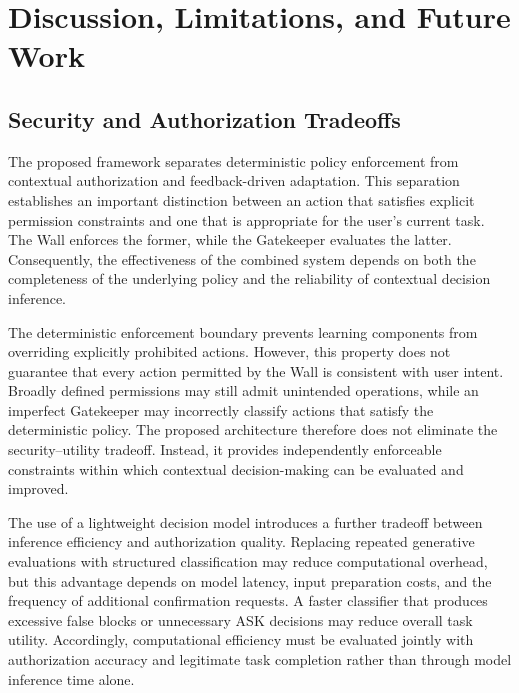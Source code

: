 \documentclass[10pt,conference]{IEEEtran}
\begin{document}

\section{Discussion, Limitations, and Future Work}

\subsection{Security and Authorization Tradeoffs}

The proposed framework separates deterministic policy enforcement from contextual authorization and feedback-driven adaptation. This separation establishes an important distinction between an action that satisfies explicit permission constraints and one that is appropriate for the user's current task. The Wall enforces the former, while the Gatekeeper evaluates the latter. Consequently, the effectiveness of the combined system depends on both the completeness of the underlying policy and the reliability of contextual decision inference.

The deterministic enforcement boundary prevents learning components from overriding explicitly prohibited actions. However, this property does not guarantee that every action permitted by the Wall is consistent with user intent. Broadly defined permissions may still admit unintended operations, while an imperfect Gatekeeper may incorrectly classify actions that satisfy the deterministic policy. The proposed architecture therefore does not eliminate the security--utility tradeoff. Instead, it provides independently enforceable constraints within which contextual decision-making can be evaluated and improved.

The use of a lightweight decision model introduces a further tradeoff between inference efficiency and authorization quality. Replacing repeated generative evaluations with structured classification may reduce computational overhead, but this advantage depends on model latency, input preparation costs, and the frequency of additional confirmation requests. A faster classifier that produces excessive false blocks or unnecessary ASK decisions may reduce overall task utility. Accordingly, computational efficiency must be evaluated jointly with authorization accuracy and legitimate task completion rather than through model inference time alone.
\end{document}
